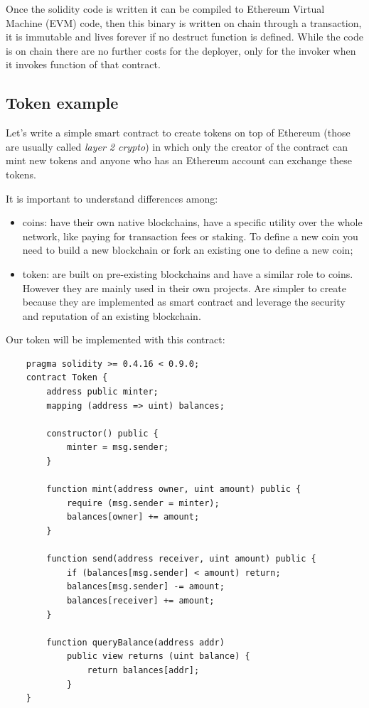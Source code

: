 Once the solidity code is written it can be compiled to Ethereum Virtual Machine (EVM) code, then this binary is written on chain through a transaction, it is immutable and lives forever if no destruct function is defined.
While the code is on chain there are no further costs for the deployer, only for the invoker when it invokes function of that contract.

\subsection{Token example}
Let's write a simple smart contract to create tokens on top of Ethereum (those are usually called \emph{layer 2 crypto}) in which only the creator of the contract can mint new tokens and anyone who has an Ethereum account can exchange these tokens.

It is important to understand differences among:
\begin{itemize}
    \item coins: have their own native blockchains, have a specific utility over the whole network, like paying for transaction fees or staking.
    To define a new coin you need to build a new blockchain or fork an existing one to define a new coin;

    \item token: are built on pre-existing blockchains and have a similar role to coins.
    However they are mainly used in their own projects.
    Are simpler to create because they are implemented as smart contract and leverage the security and reputation of an existing blockchain.
\end{itemize}

Our token will be implemented with this contract:
\begin{verbatim}
    pragma solidity >= 0.4.16 < 0.9.0;
    contract Token {
        address public minter;
        mapping (address => uint) balances;

        constructor() public {
            minter = msg.sender;
        }

        function mint(address owner, uint amount) public {
            require (msg.sender = minter);
            balances[owner] += amount;
        }

        function send(address receiver, uint amount) public {
            if (balances[msg.sender] < amount) return;
            balances[msg.sender] -= amount;
            balances[receiver] += amount;
        }

        function queryBalance(address addr)
            public view returns (uint balance) {
                return balances[addr];
            }
    }
\end{verbatim}

